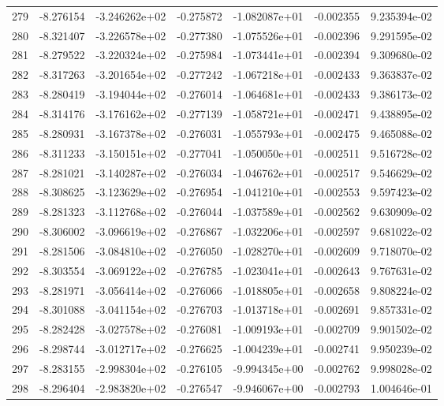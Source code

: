 \begin{tabular}{rrrrrrr}
 279 &  -8.276154 & -3.246262e+02 & -0.275872 & -1.082087e+01 &   -0.002355 &  9.235394e-02 \\
 280 &  -8.321407 & -3.226578e+02 & -0.277380 & -1.075526e+01 &   -0.002396 &  9.291595e-02 \\
 281 &  -8.279522 & -3.220324e+02 & -0.275984 & -1.073441e+01 &   -0.002394 &  9.309680e-02 \\
 282 &  -8.317263 & -3.201654e+02 & -0.277242 & -1.067218e+01 &   -0.002433 &  9.363837e-02 \\
 283 &  -8.280419 & -3.194044e+02 & -0.276014 & -1.064681e+01 &   -0.002433 &  9.386173e-02 \\
 284 &  -8.314176 & -3.176162e+02 & -0.277139 & -1.058721e+01 &   -0.002471 &  9.438895e-02 \\
 285 &  -8.280931 & -3.167378e+02 & -0.276031 & -1.055793e+01 &   -0.002475 &  9.465088e-02 \\
 286 &  -8.311233 & -3.150151e+02 & -0.277041 & -1.050050e+01 &   -0.002511 &  9.516728e-02 \\
 287 &  -8.281021 & -3.140287e+02 & -0.276034 & -1.046762e+01 &   -0.002517 &  9.546629e-02 \\
 288 &  -8.308625 & -3.123629e+02 & -0.276954 & -1.041210e+01 &   -0.002553 &  9.597423e-02 \\
 289 &  -8.281323 & -3.112768e+02 & -0.276044 & -1.037589e+01 &   -0.002562 &  9.630909e-02 \\
 290 &  -8.306002 & -3.096619e+02 & -0.276867 & -1.032206e+01 &   -0.002597 &  9.681022e-02 \\
 291 &  -8.281506 & -3.084810e+02 & -0.276050 & -1.028270e+01 &   -0.002609 &  9.718070e-02 \\
 292 &  -8.303554 & -3.069122e+02 & -0.276785 & -1.023041e+01 &   -0.002643 &  9.767631e-02 \\
 293 &  -8.281971 & -3.056414e+02 & -0.276066 & -1.018805e+01 &   -0.002658 &  9.808224e-02 \\
 294 &  -8.301088 & -3.041154e+02 & -0.276703 & -1.013718e+01 &   -0.002691 &  9.857331e-02 \\
 295 &  -8.282428 & -3.027578e+02 & -0.276081 & -1.009193e+01 &   -0.002709 &  9.901502e-02 \\
 296 &  -8.298744 & -3.012717e+02 & -0.276625 & -1.004239e+01 &   -0.002741 &  9.950239e-02 \\
 297 &  -8.283155 & -2.998304e+02 & -0.276105 & -9.994345e+00 &   -0.002762 &  9.998028e-02 \\
 298 &  -8.296404 & -2.983820e+02 & -0.276547 & -9.946067e+00 &   -0.002793 &  1.004646e-01 \\

\end{tabular}
